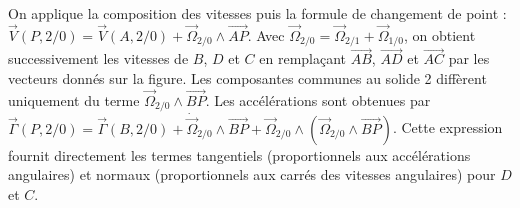 \begin{corrigebox}
On applique la composition des vitesses puis la formule de changement de point :
                $\vec V(P,2/0)=\vec V(A,2/0)+\vec\Omega_{2/0}\wedge\overrightarrow{AP}$.
                Avec $\vec\Omega_{2/0}=\vec\Omega_{2/1}+\vec\Omega_{1/0}$, on obtient
                successivement les vitesses de $B$, $D$ et $C$ en remplaçant
                $\overrightarrow{AB}$, $\overrightarrow{AD}$ et $\overrightarrow{AC}$ par
                les vecteurs donnés sur la figure. Les composantes communes au solide 2
                diffèrent uniquement du terme $\vec\Omega_{2/0}\wedge\overrightarrow{BP}$.
Les accélérations sont obtenues par
                $\vec\Gamma(P,2/0)=\vec\Gamma(B,2/0)+\dot{\vec\Omega}_{2/0}\wedge
                \overrightarrow{BP}+\vec\Omega_{2/0}\wedge(\vec\Omega_{2/0}\wedge
                \overrightarrow{BP})$. Cette expression fournit directement les termes
                tangentiels (proportionnels aux accélérations angulaires) et normaux
                (proportionnels aux carrés des vitesses angulaires) pour $D$ et $C$.
\end{corrigebox}
